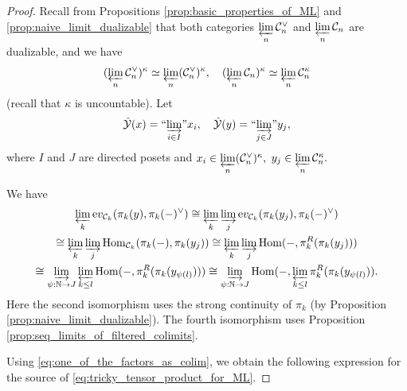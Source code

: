 \documentclass[11pt,leqno]{amsart}
\numberwithin{equation}{section}
\def\N{\mathbb{N}}
\def\Hom{\operatorname{Hom}}
\newcommand{\indlim}[1][]{\mathop{\varinjlim}\limits_{#1}}
\newcommand{\inddlim}[1][]{{``{\indlim[#1]}"}}
\newcommand{\prolim}[1][]{\mathop{\varprojlim}\limits_{#1}}
\newcommand{\ev}{\mathrm ev}
\newcommand{\cC}{{\mathcal C}}
\newcommand{\cY}{{\mathcal Y}}
\begin{document}
\begin{proof}Recall from Propositions \ref{prop:basic_properties_of_ML} and \ref{prop:naive_limit_dualizable} that both categories $\prolim[n]\cC_n^{\vee}$ and $\prolim[n]\cC_n$ are dualizable, and we have
$$(\prolim[n]\cC_n^{\vee})^{\kappa}\simeq \prolim[n](\cC_n^{\vee})^{\kappa},\quad (\prolim[n]\cC_n)^{\kappa}\simeq \prolim[n]\cC_n^{\kappa}$$
(recall that $\kappa$ is uncountable). Let $$\hat{\cY}(x)=\inddlim[i\in I] x_i,\quad \hat{\cY}(y)=\inddlim[j\in J] y_j,$$
where $I$ and $J$ are directed posets and $x_i\in\prolim[n](\cC_n^{\vee})^{\kappa},$ $y_j\in\prolim[n]\cC_n^{\kappa}.$ 

We have
\begin{multline}\label{eq:one_of_the_factors_as_colim}
\prolim[k]\ev_{\cC_k}(\pi_k(y),\pi_k(-)^{\vee})\cong\prolim[k]\indlim[j]\ev_{\cC_k}(\pi_k(y_j),\pi_k(-)^{\vee})\\
\cong \prolim[k]\indlim[j]\Hom_{\cC_k}(\pi_k(-),\pi_k(y_j))\cong \prolim[k]\indlim[j]\Hom(-,\pi_k^R(\pi_k(y_j)))\\
\cong\indlim[\psi:\N\to J]\prolim[k\leq l]\Hom(-,\pi_k^R(\pi_k(y_{\psi(l)})))\cong \indlim[\psi:\N\to J]\Hom(-,\prolim[k\leq l]\pi_k^R(\pi_k(y_{\psi(l)})).
\end{multline}
Here the second isomorphism uses the strong continuity of $\pi_k$ (by Proposition \ref{prop:naive_limit_dualizable}). The fourth isomorphism uses Proposition \ref{prop:seq_limits_of_filtered_colimits}. 

Using \eqref{eq:one_of_the_factors_as_colim}, we obtain the following expression for the source of \eqref{eq:tricky_tensor_product_for_ML}.


\end{proof}
\end{document}
